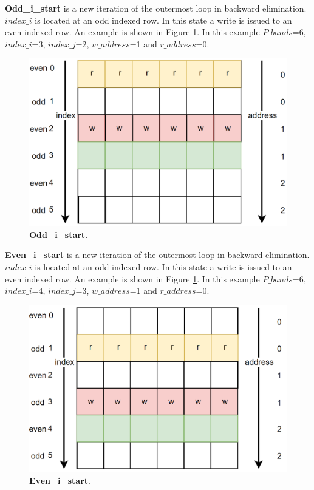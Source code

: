 \textbf{Odd\_i\_start} is a new iteration of the outermost loop in backward elimination. $index\_i$ is located at an odd indexed row.  In this state a write is issued to an even indexed row. An example is shown in Figure \ref{fig:odd_i_start}. In this example  $P\_bands$=6, $index\_i$=3, $index\_j$=2, $w\_address$=1 and $r\_address$=0.

\begin{figure}[H]
\centering
   \includegraphics[scale=0.3]{images/inverse_fsms/backward_elim/odd_i_start.PNG}
  \caption{\textbf{Odd\_i\_start}. } 
  \label{fig:odd_i_start}
\end{figure}

\textbf{Even\_i\_start} is a new iteration of the outermost loop in backward elimination. $index\_i$ is located at an odd indexed row.  In this state a write is issued to an even indexed row. An example is shown in Figure \ref{fig:odd_i_start}. In this example  $P\_bands$=6, $index\_i$=4, $index\_j$=3, $w\_address$=1 and $r\_address$=0.


\begin{figure}[H]
\centering
   \includegraphics[scale=0.3]{images/inverse_fsms/backward_elim/even_i_start.PNG}
  \caption{\textbf{Even\_i\_start}. } 
  \label{fig:even_i_start}
\end{figure}



